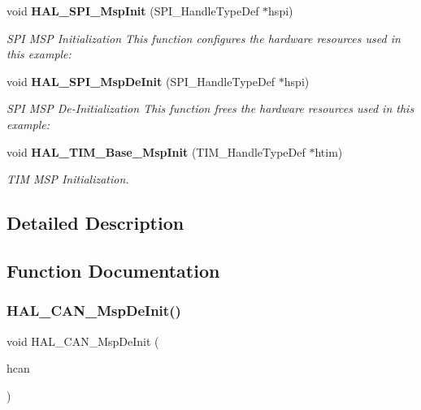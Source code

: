 \begin{DoxyCompactItemize}
void \textbf{ H\+A\+L\+\_\+\+S\+P\+I\+\_\+\+Msp\+Init} (S\+P\+I\+\_\+\+Handle\+Type\+Def $\ast$hspi)
\begin{DoxyCompactList}\small\item\em S\+PI M\+SP Initialization This function configures the hardware resources used in this example\+: \end{DoxyCompactList}\item 
void \textbf{ H\+A\+L\+\_\+\+S\+P\+I\+\_\+\+Msp\+De\+Init} (S\+P\+I\+\_\+\+Handle\+Type\+Def $\ast$hspi)
\begin{DoxyCompactList}\small\item\em S\+PI M\+SP De-\/\+Initialization This function frees the hardware resources used in this example\+: \end{DoxyCompactList}\item 
void \textbf{ H\+A\+L\+\_\+\+T\+I\+M\+\_\+\+Base\+\_\+\+Msp\+Init} (T\+I\+M\+\_\+\+Handle\+Type\+Def $\ast$htim)
\begin{DoxyCompactList}\small\item\em T\+IM M\+SP Initialization. \end{DoxyCompactList}\end{DoxyCompactItemize}


\subsection{Detailed Description}


\subsection{Function Documentation}
\mbox{\label{group___h_a_l___m_s_p___private___functions_ga7961550b05594a87512b20a4157713e8}} 
\subsubsection{H\+A\+L\+\_\+\+C\+A\+N\+\_\+\+Msp\+De\+Init()}
{\footnotesize\ttfamily void H\+A\+L\+\_\+\+C\+A\+N\+\_\+\+Msp\+De\+Init (\begin{DoxyParamCaption}\item[{C\+A\+N\+\_\+\+Handle\+Type\+Def $\ast$}]{hcan }\end{DoxyParamCaption})}



